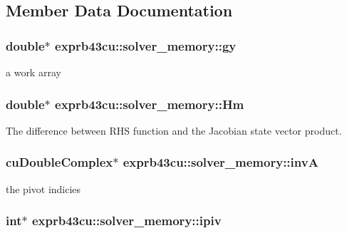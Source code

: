 \subsection{Member Data Documentation}
\subsubsection[{\texorpdfstring{gy}{gy}}]{\setlength{\rightskip}{0pt plus 5cm}double$\ast$ exprb43cu\+::solver\+\_\+memory\+::gy}\hypertarget{structexprb43cu_1_1solver__memory_a020f6e5fb98c3395373e8098c0b726ee}{}\label{structexprb43cu_1_1solver__memory_a020f6e5fb98c3395373e8098c0b726ee}


a work array 

\subsubsection[{\texorpdfstring{Hm}{Hm}}]{\setlength{\rightskip}{0pt plus 5cm}double$\ast$ exprb43cu\+::solver\+\_\+memory\+::\+Hm}\hypertarget{structexprb43cu_1_1solver__memory_a2ca03f02755ba0786e0460f33542216b}{}\label{structexprb43cu_1_1solver__memory_a2ca03f02755ba0786e0460f33542216b}


The difference between R\+HS function and the Jacobian state vector product. 

\subsubsection[{\texorpdfstring{invA}{invA}}]{\setlength{\rightskip}{0pt plus 5cm}cu\+Double\+Complex$\ast$ exprb43cu\+::solver\+\_\+memory\+::invA}\hypertarget{structexprb43cu_1_1solver__memory_a41d0878433e4e8e15ce8403b8efc8c23}{}\label{structexprb43cu_1_1solver__memory_a41d0878433e4e8e15ce8403b8efc8c23}


the pivot indicies 

\subsubsection[{\texorpdfstring{ipiv}{ipiv}}]{\setlength{\rightskip}{0pt plus 5cm}int$\ast$ exprb43cu\+::solver\+\_\+memory\+::ipiv}\hypertarget{structexprb43cu_1_1solver__memory_ad00e33aaa4241cc8356ea30869d311ff}{}\label{structexprb43cu_1_1solver__memory_ad00e33aaa4241cc8356ea30869d311ff}



